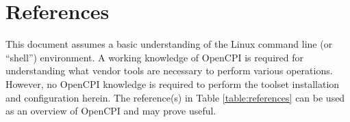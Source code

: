\newpage

\tableofcontents

\newpage

\section{References}

	This document assumes a basic understanding of the Linux command line (or ``shell'') environment. A working knowledge of OpenCPI is required for understanding what vendor tools are necessary to perform various operations. However, no OpenCPI knowledge is required to perform the toolset installation and configuration herein. The reference(s) in Table \ref{table:references} can be used as an overview of OpenCPI and may prove useful.
\def\refcapbottom{}


